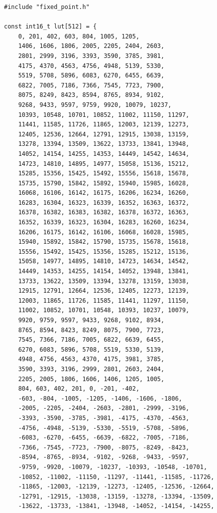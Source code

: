 \begin{lstlisting}
#include "fixed_point.h"

const int16_t lut[512] = {
    0, 201, 402, 603, 804, 1005, 1205,
    1406, 1606, 1806, 2005, 2205, 2404, 2603,
    2801, 2999, 3196, 3393, 3590, 3785, 3981,
    4175, 4370, 4563, 4756, 4948, 5139, 5330,
    5519, 5708, 5896, 6083, 6270, 6455, 6639,
    6822, 7005, 7186, 7366, 7545, 7723, 7900,
    8075, 8249, 8423, 8594, 8765, 8934, 9102,
    9268, 9433, 9597, 9759, 9920, 10079, 10237,
    10393, 10548, 10701, 10852, 11002, 11150, 11297,
    11441, 11585, 11726, 11865, 12003, 12139, 12273,
    12405, 12536, 12664, 12791, 12915, 13038, 13159,
    13278, 13394, 13509, 13622, 13733, 13841, 13948,
    14052, 14154, 14255, 14353, 14449, 14542, 14634,
    14723, 14810, 14895, 14977, 15058, 15136, 15212,
    15285, 15356, 15425, 15492, 15556, 15618, 15678,
    15735, 15790, 15842, 15892, 15940, 15985, 16028,
    16068, 16106, 16142, 16175, 16206, 16234, 16260,
    16283, 16304, 16323, 16339, 16352, 16363, 16372,
    16378, 16382, 16383, 16382, 16378, 16372, 16363,
    16352, 16339, 16323, 16304, 16283, 16260, 16234,
    16206, 16175, 16142, 16106, 16068, 16028, 15985,
    15940, 15892, 15842, 15790, 15735, 15678, 15618,
    15556, 15492, 15425, 15356, 15285, 15212, 15136,
    15058, 14977, 14895, 14810, 14723, 14634, 14542,
    14449, 14353, 14255, 14154, 14052, 13948, 13841,
    13733, 13622, 13509, 13394, 13278, 13159, 13038,
    12915, 12791, 12664, 12536, 12405, 12273, 12139,
    12003, 11865, 11726, 11585, 11441, 11297, 11150,
    11002, 10852, 10701, 10548, 10393, 10237, 10079,
    9920, 9759, 9597, 9433, 9268, 9102, 8934,
    8765, 8594, 8423, 8249, 8075, 7900, 7723,
    7545, 7366, 7186, 7005, 6822, 6639, 6455,
    6270, 6083, 5896, 5708, 5519, 5330, 5139,
    4948, 4756, 4563, 4370, 4175, 3981, 3785,
    3590, 3393, 3196, 2999, 2801, 2603, 2404,
    2205, 2005, 1806, 1606, 1406, 1205, 1005,
    804, 603, 402, 201, 0, -201, -402,
    -603, -804, -1005, -1205, -1406, -1606, -1806,
    -2005, -2205, -2404, -2603, -2801, -2999, -3196,
    -3393, -3590, -3785, -3981, -4175, -4370, -4563,
    -4756, -4948, -5139, -5330, -5519, -5708, -5896,
    -6083, -6270, -6455, -6639, -6822, -7005, -7186,
    -7366, -7545, -7723, -7900, -8075, -8249, -8423,
    -8594, -8765, -8934, -9102, -9268, -9433, -9597,
    -9759, -9920, -10079, -10237, -10393, -10548, -10701,
    -10852, -11002, -11150, -11297, -11441, -11585, -11726,
    -11865, -12003, -12139, -12273, -12405, -12536, -12664,
    -12791, -12915, -13038, -13159, -13278, -13394, -13509,
    -13622, -13733, -13841, -13948, -14052, -14154, -14255,

\end{lstlisting}
